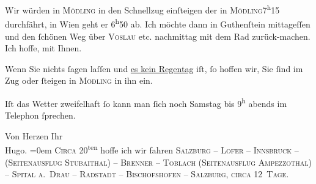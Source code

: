 \pstart
           Wir würden in \textsc{Mödling} in den Schnellzug einſteigen der in \textsc{Mödling}7\textsuperscript{h}15 durchfährt, in Wien geht er 6\textsuperscript{h}50 ab.
               Ich möchte dann in Guthenſtein mittageſſen {\pb}und den{ }ſchönen Weg über \textsc{Vöslau} etc. nachmittag mit dem Rad zurück-machen. Ich hoffe, mit Ihnen.\pend
           
\pstart
           Wenn Sie nichts{ }ſagen laſſen und \uline{es kein Regentag}
               iſt,{ }ſo hoffen wir, Sie{ }ſind im Zug oder{ }ſteigen in \textsc{Mödling} in ihn ein.\pend
           
\pstart
           {\pb}Iſt das Wetter zweifelhaft{ }ſo
               kann man{ }ſich noch Samstag bis 9\textsuperscript{h} abends im Telephon{ }ſprechen.\pend
           
\pstart
           Von Herzen Ihr{\\[\baselineskip]}\spacefill\mbox{Hugo.}\pend
           \leftskip=0em{}
\pstart
           \noindent{}\textsc{Circa} 20\textsuperscript{ten} hoffe ich wir
                  fahren \textsc{Salzburg – Lofer – Innsbruck – (Seitenausflug
                        Stubaithal) – Brenner – Toblach
                     (Seitenausflug Ampezzothal) – Spital a. Drau – Radstadt – Bischofshofen – Salzburg, circa
                     12 Tage}.\pend
           \endnumbering{}  \newcommand{\dateiname}{L01222}\newcommand{\titel}{Hugo von Hofmannsthal an Arthur Schnitzler, 1[1?]. 6. 1902}\newcommand{\editorInnen}{Martin Anton Müller und Gerd-Hermann Susen}
